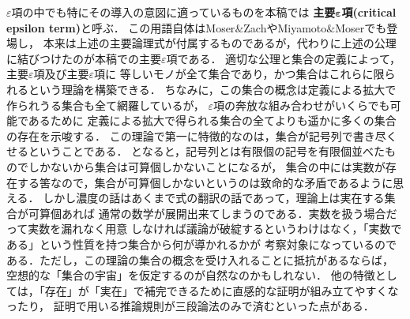 	$\varepsilon$項の中でも特にその導入の意図に適っているものを本稿では
	{\bf 主要${\boldsymbol \varepsilon}$項}{\bf (critical epsilon term)}と呼ぶ．
	この用語自体はMoser$\&$Zach\cite{Moser_Zach}やMiyamoto$\&$Moser\cite{Miyamoto_Moser}でも登場し，
	本来は上述の主要論理式が付属するものであるが，代わりに上述の公理に結びつけたのが本稿での主要$\varepsilon$項である．
	適切な公理と集合の定義によって，主要$\varepsilon$項及び主要$\varepsilon$項に
	等しいモノが全て集合であり，かつ集合はこれらに限られるという理論を構築できる．
	ちなみに，この集合の概念は定義による拡大で作られうる集合も全て網羅しているが，
	$\varepsilon$項の奔放な組み合わせがいくらでも可能であるために
	定義による拡大で得られる集合の全てよりも遥かに多くの集合の存在を示唆する．
	この理論で第一に特徴的なのは，集合が記号列で書き尽くせるということである．
	となると，記号列とは有限個の記号を有限個並べたものでしかないから集合は可算個しかないことになるが，
	集合の中には実数が存在する筈なので，集合が可算個しかないというのは致命的な矛盾であるように思える．
	しかし濃度の話はあくまで式の翻訳の話であって，理論上は実在する集合が可算個あれば
	通常の数学が展開出来てしまうのである．実数を扱う場合だって実数を漏れなく用意
	しなければ議論が破綻するというわけはなく，「実数である」という性質を持つ集合から何が導かれるかが
	考察対象になっているのである．ただし，この理論の集合の概念を受け入れることに抵抗があるならば，
	空想的な「集合の宇宙」を仮定するのが自然なのかもしれない．
	他の特徴としては，「存在」が「実在」で補完できるために直感的な証明が組み立てやすくなったり，
	証明で用いる推論規則が三段論法のみで済むといった点がある．
	
